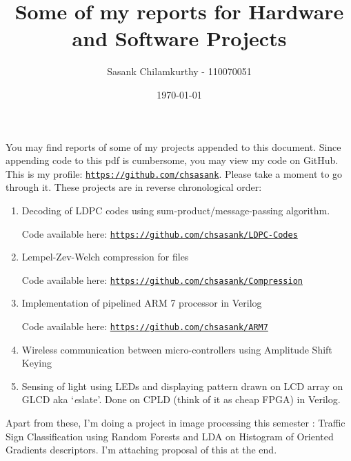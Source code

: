\documentclass[a4paper]{article}
\begin{document}
\title{Some of my reports for Hardware and Software Projects}
\author{Sasank Chilamkurthy - 110070051}
\date{\today}
\maketitle

You may find reports of some of my projects appended to this document. Since appending code to this pdf is cumbersome, you may view my code on GitHub. This is my profile: \texttt{\href{https://github.com/chsasank}{https://github.com/chsasank}}. 
Please take a moment to go through it.
These projects are in reverse chronological order:
\begin{enumerate}
\item Decoding of LDPC codes using sum-product/message-passing algorithm. 

Code available here: \texttt{\href{https://github.com/chsasank/LDPC-Codes}{https://github.com/chsasank/LDPC-Codes}}
\item Lempel-Zev-Welch compression for files

Code available here: \texttt{\href{https://github.com/chsasank/Compression}{https://github.com/chsasank/Compression}}
\item Implementation of pipelined ARM 7 processor in Verilog

Code available here: \texttt{\href{https://github.com/chsasank/ARM7}{https://github.com/chsasank/ARM7}}
\item Wireless communication between micro-controllers using Amplitude Shift Keying
\item Sensing of light using LEDs and displaying pattern drawn on LCD array on GLCD aka `\emph{e}slate'. Done on CPLD (think of it as cheap FPGA) in Verilog.
\end{enumerate}

Apart from these, I'm doing a project in image processing this semester : Traffic Sign Classification using Random Forests and LDA on Histogram of Oriented Gradients descriptors. I'm attaching proposal of this at the end.










\end{document}
